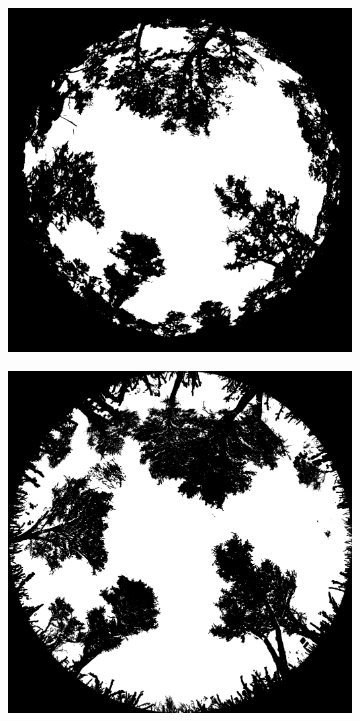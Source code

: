 \begin{refsection}
\begin{figure}
	\begin{subfigure}{0.45\linewidth}
		\includegraphics[width=\linewidth]{img/hemi_hemi}
		\caption{}
		\label{workflow:hemi_hemi}
	\end{subfigure}
	\hfill
	\begin{subfigure}{0.45\linewidth}
		\includegraphics[width=\linewidth]{img/hemi_tls}

\end{subfigure}
\end{figure}
\end{refsection}
